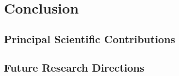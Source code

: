 

\chapter{Conclusion}
\label{ch:conclusion}
\lipsum[60-61]


\section{Principal Scientific Contributions}
\lipsum[62-63]


\section{Future Research Directions}
\lipsum[64-65]
